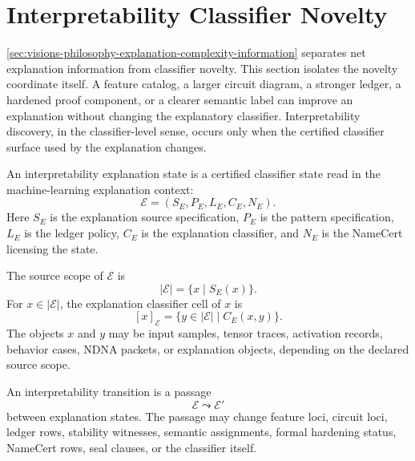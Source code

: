 \section{Interpretability Classifier Novelty}
\label{sec:visions-philosophy-interpretability-classifier-novelty}

\autoref{sec:visions-philosophy-explanation-complexity-information}
separates net explanation information from classifier novelty. This
section isolates the novelty coordinate itself. A feature catalog, a
larger circuit diagram, a stronger ledger, a hardened proof component,
or a clearer semantic label can improve an explanation without changing
the explanatory classifier. Interpretability discovery, in the
classifier-level sense, occurs only when the certified classifier surface
used by the explanation changes.

\begin{definition}
\label{def:philosophy-interpretability-explanation-state}
An interpretability explanation state is a certified classifier state
read in the machine-learning explanation context:
$$
\mathcal E=(S_E,P_E,L_E,C_E,N_E).
$$
Here $S_E$ is the explanation source specification, $P_E$ is the pattern
specification, $L_E$ is the ledger policy, $C_E$ is the explanation
classifier, and $N_E$ is the NameCert licensing the state.
\end{definition}

\begin{definition}
\label{def:philosophy-explanation-source-scope-cell}
The source scope of $\mathcal E$ is
$$
|\mathcal E|
=
\{x\mid S_E(x)\}.
$$
For $x\in|\mathcal E|$, the explanation classifier cell of $x$ is
$$
[x]_{\mathcal E}
=
\{y\in|\mathcal E|\mid C_E(x,y)\}.
$$
The objects $x$ and $y$ may be input samples, tensor traces, activation
records, behavior cases, NDNA packets, or explanation objects, depending
on the declared source scope.
\end{definition}

\begin{definition}
\label{def:philosophy-interpretability-transition}
An interpretability transition is a passage
$$
\mathcal E\leadsto\mathcal E'
$$
between explanation states. The passage may change feature loci, circuit
loci, ledger rows, stability witnesses, semantic assignments, formal
hardening status, NameCert rows, seal clauses, or the classifier itself.
\end{definition}

